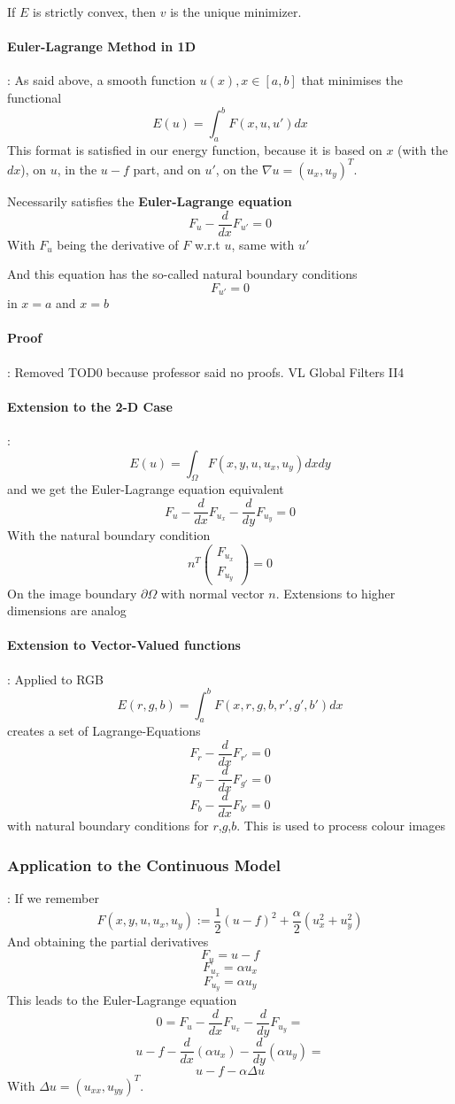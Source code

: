 \documentclass{article}
\begin{document}
If $E$ is strictly convex, then $v$ is the unique minimizer.

\paragraph{Euler-Lagrange Method in 1D}: As said above, a smooth function $u(x), x\in [a,b]$ that minimises the functional
\[E(u) = \int_a^b F(x,u,u') dx\]
This format is satisfied in our energy function, because it is based on $x$ (with the $dx$), on $u$, in the $u-f$ part, and on $u'$, on the $\nabla u = (u_x,u_y)^T$.

Necessarily satisfies the \textbf{Euler-Lagrange equation}
\[F_u - \frac{d}{dx}F_{u'} = 0\]
With $F_u$ being the derivative of $F$ w.r.t $u$, same with $u'$

And this equation has the so-called natural boundary conditions
\[F_{u'} = 0\]
in $x=a$ and $x=b$

\paragraph{Proof}: Removed TOD0 because professor said no proofs. VL Global Filters II4

\paragraph{Extension to the 2-D Case}: 
\[E(u) = \int_{\Omega} F(x,y,u,u_x,u_y)dxdy\]
and we get the Euler-Lagrange equation equivalent
\[F_u - \frac{d}{dx}F_{u_x} - \frac{d}{dy}F_{u_y} = 0\]
With the natural boundary condition
\[n^T \begin{pmatrix}
  F_{u_x} \\
  F_{u_y}
\end{pmatrix} = 0\]
On the image boundary $\partial \Omega$ with normal vector $n$. Extensions to higher dimensions are analog

\paragraph{Extension to Vector-Valued functions}: Applied to RGB
\[E(r,g,b) = \int_a^b F(x,r,g,b,r',g',b')dx\]
creates a set of Lagrange-Equations
\[F_r - \frac{d}{dx}F_{r'} = 0\]
\[F_g - \frac{d}{dx}F_{g'} = 0\]
\[F_b - \frac{d}{dx}F_{b'} = 0\]
with natural boundary conditions for $r$,$g$,$b$. This is used to process colour images

\subsubsection{Application to the Continuous Model}: If we remember
\[F(x,y,u,u_x,u_y) := \frac{1}{2}(u-f)^2 + \frac{\alpha}{2}(u_x^2 + u_y^2)\]
And obtaining the partial derivatives
\[F_u = u-f\]
\[F_{u_x} = \alpha u_x\]
\[F_{u_y} = \alpha u_y\]
This leads to the Euler-Lagrange equation
\[0 = F_u - \frac{d}{dx}F_{u_x} - \frac{d}{dy}F_{u_y} = \]
\[u-f - \frac{d}{dx}(\alpha u_x) - \frac{d}{dy}(\alpha u_y) = \]
\[u - f - \alpha \Delta u\]
With $\Delta u = (u_{xx} , u_{yy})^T$.
\end{document}
